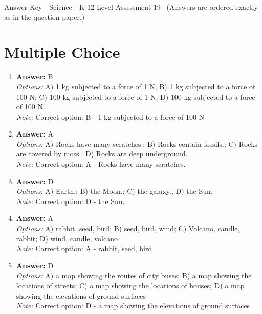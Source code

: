 \documentclass[12pt]{article}
\begin{document}
\begin{center}
Answer Key - Science - K-12 Level Assessment 19 \
\small (Answers are ordered exactly as in the question paper.)
\end{center}

\section*{Multiple Choice}
\begin{enumerate}[label=\arabic*.]
\item \textbf{Answer:} B
\\ \textit{Options:} A) 1 kg subjected to a force of 1 N; B) 1 kg subjected to a force of 100 N; C) 100 kg subjected to a force of 1 N; D) 100 kg subjected to a force of 100 N
\\ \textit{Note:} Correct option: B - 1 kg subjected to a force of 100 N
\item \textbf{Answer:} A
\\ \textit{Options:} A) Rocks have many scratches.; B) Rocks contain fossils.; C) Rocks are covered by moss.; D) Rocks are deep underground.
\\ \textit{Note:} Correct option: A - Rocks have many scratches.
\item \textbf{Answer:} D
\\ \textit{Options:} A) Earth.; B) the Moon.; C) the galaxy.; D) the Sun.
\\ \textit{Note:} Correct option: D - the Sun.
\item \textbf{Answer:} A
\\ \textit{Options:} A) rabbit, seed, bird; B) seed, bird, wind; C) Volcano, candle, rabbit; D) wind, candle, volcano
\\ \textit{Note:} Correct option: A - rabbit, seed, bird
\item \textbf{Answer:} D
\\ \textit{Options:} A) a map showing the routes of city buses; B) a map showing the locations of streets; C) a map showing the locations of houses; D) a map showing the elevations of ground surfaces
\\ \textit{Note:} Correct option: D - a map showing the elevations of ground surfaces
\end{enumerate}
\end{document}
